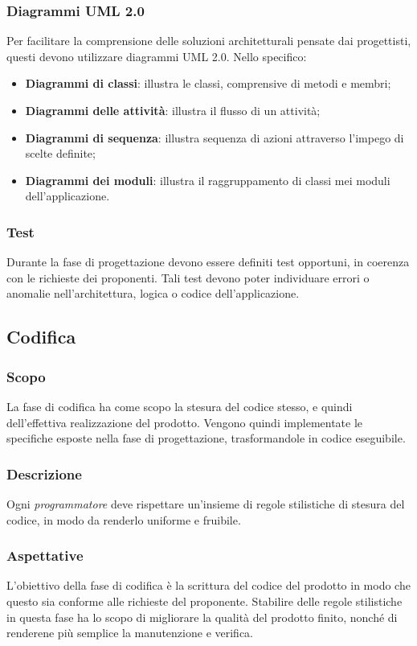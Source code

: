 \subsubsection{Diagrammi UML 2.0}
Per facilitare la comprensione delle soluzioni architetturali pensate dai progettisti, questi devono utilizzare diagrammi UML 2.0.
Nello specifico:
\begin{itemize}
    \item \textbf{Diagrammi di classi}: illustra le classi, comprensive di metodi e membri;
    \item \textbf{Diagrammi delle attività}: illustra il flusso di un attività;
    \item \textbf{Diagrammi di sequenza}: illustra sequenza di azioni attraverso l'impego di scelte definite;
    \item \textbf{Diagrammi dei moduli}: illustra il raggruppamento di classi mei moduli dell'applicazione.
\end{itemize}
\subsubsection{Test}
Durante la fase di progettazione devono essere definiti test opportuni, in coerenza con le richieste dei proponenti.
Tali test devono poter individuare errori o anomalie nell'architettura, logica o codice dell'applicazione.

\subsection{Codifica}
\subsubsection{Scopo}
La fase di codifica ha come scopo la stesura del codice stesso, e quindi dell'effettiva realizzazione del prodotto.
Vengono quindi implementate le specifiche esposte nella fase di progettazione, trasformandole in codice eseguibile.
\subsubsection{Descrizione}
Ogni \textit{programmatore} deve rispettare un'insieme di regole stilistiche di stesura del codice, in modo da renderlo uniforme e fruibile.
\subsubsection{Aspettative}
L'obiettivo della fase di codifica è la scrittura del codice del prodotto in modo che questo sia conforme alle richieste del proponente.
Stabilire delle regole stilistiche in questa fase ha lo scopo di migliorare la qualità del prodotto finito, nonché di renderene più semplice la manutenzione e verifica.
